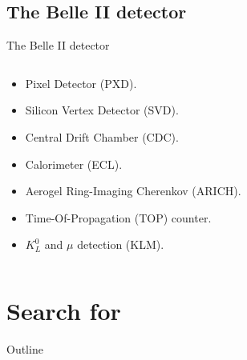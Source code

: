 \subsection{The Belle II detector}
\begin{frame}{{The Belle II detector}}
\begin{columns}
\begin{column}{0.45\linewidth} 
\begin{itemize} \small
\item Pixel Detector (PXD).
\vspace{0.25cm}
\item Silicon Vertex Detector (SVD).
\vspace{0.25cm}
\item Central Drift Chamber (CDC).
\vspace{0.25cm}
\item Calorimeter (ECL).
\vspace{0.25cm}
\item Aerogel Ring-Imaging Cherenkov (ARICH).
\vspace{0.25cm}
\item Time-Of-Propagation (TOP) counter.
\vspace{0.25cm}
\item $K_L^0$ and $\mu$ detection (KLM).
\end{itemize}
\end{column}
\begin{column}{0.55\linewidth}
\centering
{}
\end{column}
\end{columns}
\end{frame}
\section{Search for \BKnn}
\begin{frame}{Outline}
 \tableofcontents[currentsection]
\end{frame}

